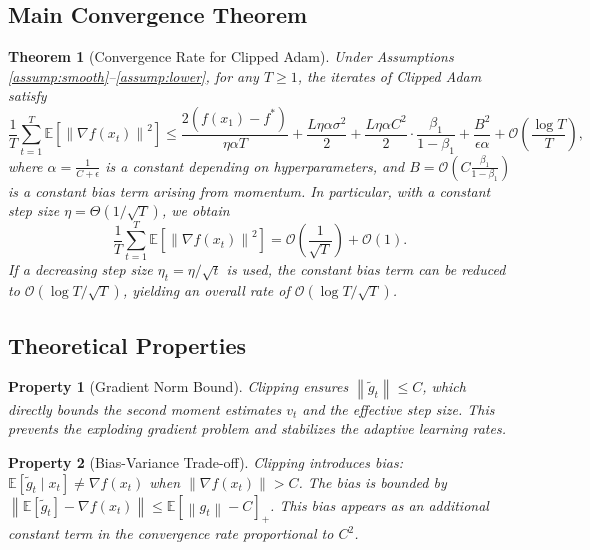 \documentclass{article}
\newtheorem{theorem}{Theorem}
\newtheorem{property}{Property}
\newcommand{\E}{\mathbb{E}}
\newcommand{\norm}[1]{\left\| #1 \right\|}
\begin{document}
\subsection*{Main Convergence Theorem}
\begin{theorem}[Convergence Rate for Clipped Adam] \label{thm:main}
    Under Assumptions \ref{assump:smooth}--\ref{assump:lower}, for any $T \ge 1$, the iterates of Clipped Adam satisfy
    \[
        \frac{1}{T} \sum_{t=1}^T \E\left[ \norm{\nabla f(x_t)}^2 \right]
        \le \frac{2(f(x_1)-f^*)}{\eta \alpha T} + \frac{L \eta \alpha \sigma^2}{2} + \frac{L \eta \alpha C^2}{2} \cdot \frac{\beta_1}{1-\beta_1} + \frac{B^2}{\epsilon \alpha} + \mathcal{O}\left(\frac{\log T}{T}\right),
    \]
    where $\alpha = \frac{1}{C+\epsilon}$ is a constant depending on hyperparameters, and $B = \mathcal{O}\left(C \frac{\beta_1}{1-\beta_1}\right)$ is a constant bias term arising from momentum. In particular, with a constant step size $\eta = \Theta(1/\sqrt{T})$, we obtain
    \[
        \frac{1}{T} \sum_{t=1}^T \E\left[ \norm{\nabla f(x_t)}^2 \right] = \mathcal{O}\left(\frac{1}{\sqrt{T}}\right) + \mathcal{O}(1).
    \]
    If a decreasing step size $\eta_t = \eta/\sqrt{t}$ is used, the constant bias term can be reduced to $\mathcal{O}(\log T/\sqrt{T})$, yielding an overall rate of $\mathcal{O}(\log T/\sqrt{T})$.
\end{theorem}

\subsection*{Theoretical Properties}
\begin{property}[Gradient Norm Bound]
    Clipping ensures $\norm{\tilde{g}_t} \le C$, which directly bounds the second moment estimates $v_t$ and the effective step size. This prevents the exploding gradient problem and stabilizes the adaptive learning rates.
\end{property}

\begin{property}[Bias-Variance Trade-off]
    Clipping introduces bias: $\E[\tilde{g}_t \mid x_t] \neq \nabla f(x_t)$ when $\norm{\nabla f(x_t)} > C$. The bias is bounded by $\norm{\E[\tilde{g}_t] - \nabla f(x_t)} \le \E[\norm{g_t} - C]_+$. This bias appears as an additional constant term in the convergence rate proportional to $C^2$.
\end{property}
\end{document}
